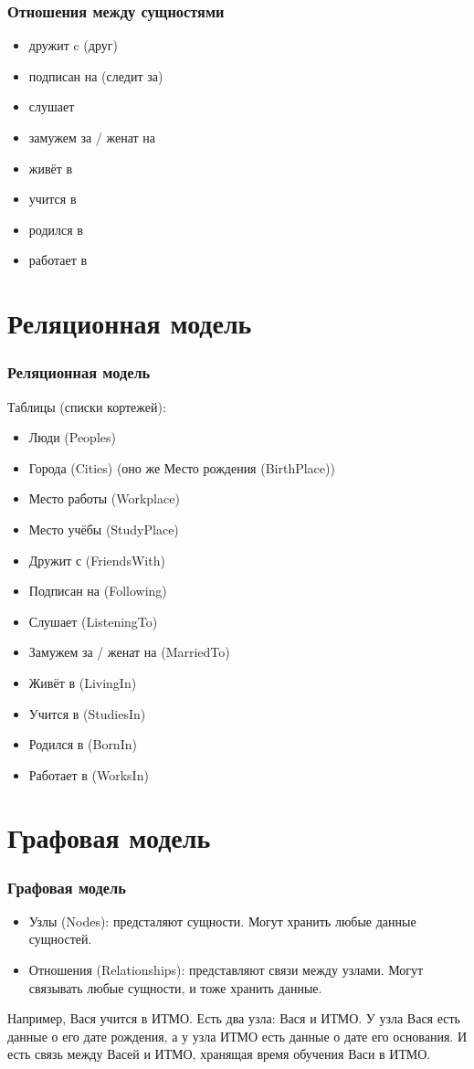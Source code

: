 \documentclass[11pt]{beamer}
\begin{document}
\begin{frame}
  \frametitle{Отношения между сущностями}
  \begin{itemize}
  \item дружит c (друг)
  \item подписан на (следит за)
  \item слушает
  \item замужем за / женат на
  \item живёт в
  \item учится в
  \item родился в
  \item работает в
  \end{itemize}
\end{frame}

\section{Реляционная модель}

\begin{frame}
  \frametitle{Реляционная модель}
  Таблицы (списки кортежей):
  \begin{itemize}
  \item Люди (Peoples)
  \item Города (Cities) (оно же Место рождения (BirthPlace))
  \item Место работы (Workplace)
  \item Место учёбы (StudyPlace)
  \item Дружит с (FriendsWith)
  \item Подписан на (Following)
  \item Слушает (ListeningTo)
  \item Замужем за / женат на (MarriedTo)
  \item Живёт в (LivingIn)
  \item Учится в (StudiesIn)
  \item Родился в (BornIn)
  \item Работает в (WorksIn)
  \end{itemize}
\end{frame}

\section{Графовая модель}

\begin{frame}
  \frametitle{Графовая модель}
  \begin{itemize}
  \item Узлы (Nodes): предсталяют сущности. Могут хранить любые данные сущностей.
  \item Отношения (Relationships): представляют связи между узлами.
    Могут связывать любые сущности, и тоже хранить данные.
  \end{itemize}
  Например, Вася учится в ИТМО. Есть два узла: Вася и ИТМО. У узла Вася есть данные
  о его дате рождения, а у узла ИТМО есть данные о дате его основания.
  И есть связь между Васей и ИТМО, хранящая время обучения Васи в ИТМО.
\end{frame}
\end{document}
